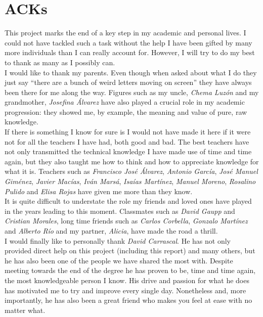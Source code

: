 \chapter*{ACKs}
    \thispagestyle{empty}

    This project marks the end of a key step in my academic and personal lives. I could not have tackled such a task without the help I have been gifted by many more individuals than I can really account for. However, I will try to do my best to thank as many as I possibly can.\\

    I would like to thank my parents. Even though when asked about what I do they just say ``there are a bunch of weird letters moving on screen'' they have always been there for me along the way. Figures such as my uncle, \textit{Chema Luzón} and my grandmother, \textit{Josefina Álvarez} have also played a crucial role in my academic progression: they showed me, by example, the meaning and value of pure, raw knowledge.\\

    If there is something I know for sure is I would not have made it here if it were not for all the teachers I have had, both good and bad. The best teachers have not only transmitted the technical knowledge I have made use of time and time again, but they also taught me how to think and how to appreciate knowledge for what it is. Teachers such as \textit{Francisco José Álvarez}, \textit{Antonio García}, \textit{José Manuel Giménez}, \textit{Javier Macías}, \textit{Iván Marsá}, \textit{Isaías Martínez}, \textit{Manuel Moreno}, \textit{Rosalino Pulido} and \textit{Elisa Rojas} have given me more than they know.\\

    It is quite difficult to understate the role my friends and loved ones have played in the years leading to this moment. Classmates such as \textit{David Gaupp} and \textit{Cristian Morales}, long time friends such as \textit{Carlos Corbella}, \textit{Gonzalo Martínez} and \textit{Alberto Río} and my partner, \textit{Alicia}, have made the road a thrill.\\

    I would finally like to personally thank \textit{David Carrascal}. He has not only provided direct help on this project (including this report) and many others, but he has also been one of the people we have shared the most with. Despite meeting towards the end of the degree he has proven to be, time and time again, the most knowledgeable person I know. His drive and passion for what he does has motivated me to try and improve every single day. Nonetheless and, more importantly, he has also been a great friend who makes you feel at ease with no matter what.\\

